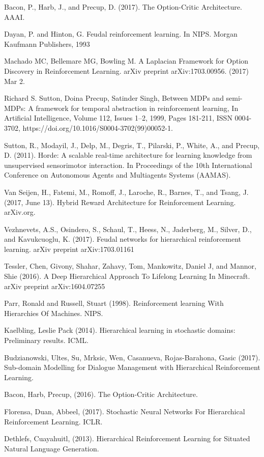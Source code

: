 \begin{thebibliography}{1}

\bibitem{} Bacon, P., Harb, J., and Precup, D. (2017). The Option-Critic Architecture. AAAI.

\bibitem{} Dayan, P. and Hinton, G. Feudal reinforcement learning. In NIPS. Morgan Kaufmann Publishers, 1993

\bibitem{} Machado MC, Bellemare MG, Bowling M. A Laplacian Framework for Option Discovery in Reinforcement Learning. arXiv preprint arXiv:1703.00956. (2017) Mar 2.

\bibitem{} Richard S. Sutton, Doina Precup, Satinder Singh, Between MDPs and semi-MDPs: A framework for temporal abstraction in reinforcement learning, In Artificial Intelligence, Volume 112, Issues 1–2, 1999, Pages 181-211, ISSN 0004-3702, https://doi.org/10.1016/S0004-3702(99)00052-1.

\bibitem{} Sutton, R., Modayil, J., Delp, M., Degris, T., Pilarski, P., White, A., and Precup, D. (2011). Horde: A scalable real-time architecture for learning knowledge from unsupervised sensorimotor interaction. In Proceedings of the 10th International Conference on Autonomous
Agents and Multiagents Systems (AAMAS).

\bibitem{} Van Seijen, H., Fatemi, M., Romoff, J., Laroche, R., Barnes, T., and Tsang, J. (2017, June 13). Hybrid Reward Architecture for Reinforcement Learning. arXiv.org.

\bibitem{} Vezhnevets, A.S., Osindero, S., Schaul, T., Heess, N., Jaderberg, M., Silver, D., and Kavukcuoglu, K. (2017). Feudal networks for hierarchical reinforcement learning. arXiv preprint arXiv:1703.01161

\bibitem{} Tessler, Chen, Givony, Shahar, Zahavy, Tom, Mankowitz, Daniel J, and Mannor, Shie (2016). A Deep Hierarchical Approach To Lifelong Learning In Minecraft. arXiv preprint arXiv:1604.07255

\bibitem{} Parr, Ronald and Russell, Stuart (1998). Reinforcement learning With Hierarchies Of Machines. NIPS.

\bibitem{} Kaelbling, Leslie Pack (2014). Hierarchical learning in stochastic domains: Preliminary results. ICML.

\bibitem{} Budzianowski, Ultes, Su, Mrksic, Wen, Casanueva, Rojas-Barahona, Gasic (2017). Sub-domain Modelling for Dialogue Management with Hierarchical Reinforcement Learning.

\bibitem{} Bacon, Harb, Precup, (2016). The Option-Critic Architecture.

\bibitem{} Florensa, Duan, Abbeel, (2017). Stochastic Neural Networks For Hierarchical Reinforcement Learning. ICLR.

\bibitem{} Dethlefs, Cuayahuitl, (2013). Hierarchical Reinforcement Learning for Situated Natural Language Generation.

\end{thebibliography}